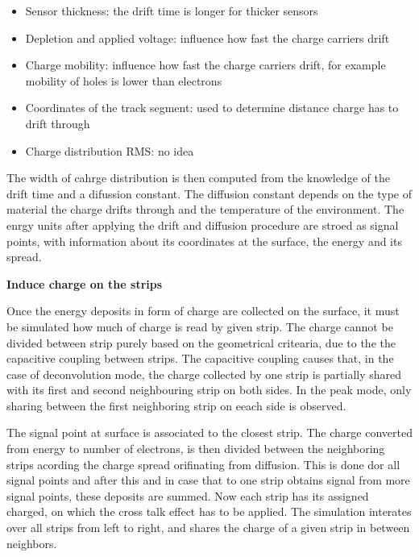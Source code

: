 \begin{itemize}
\item Sensor thickness: the drift time is longer for thicker sensors
\item Depletion and applied voltage: influence how fast the charge carriers drift
\item Charge mobility: influence how fast the charge carriers drift, for example mobility of holes is lower than electrons
\item Coordinates of the track segment: used to determine distance charge has to drift through
\item Charge distribution RMS: no idea %
\end{itemize}

The width of cahrge distribution is then computed from the knowledge of the drift time and a difussion constant. The diffusion constant depends on the type of material the charge drifts through and the temperature of the environment. The enrgy units after applying the drift and diffusion procedure are stroed as signal points, with information about its coordinates at the surface, the energy and its spread.


\textbf{Induce charge on the strips}

Once the energy deposits in form of charge are collected on the surface, it must be simulated how much of charge is read by given strip. The charge cannot be divided between strip purely based on the geometrical critearia, due to the the capacitive coupling between strips. The capacitive coupling causes that, in the case of deconvolution mode, the charge collected by one strip is partially shared with its first and second neighbouring strip on both sides. In the peak mode, only sharing between the first neighboring strip on eeach side is observed.   


The signal point at surface is associated to the closest strip. The charge converted from energy to number of electrons, is then divided between the neighboring strips acording the charge spread orifinating from diffusion. This is done dor all signal points and after this and in case that to one strip obtains signal from more signal points, these deposits are summed. Now each strip has its assigned charged, on which the cross talk effect has to be applied. The simulation interates over all strips from left to right, and shares the charge of a given strip in between neighbors.

